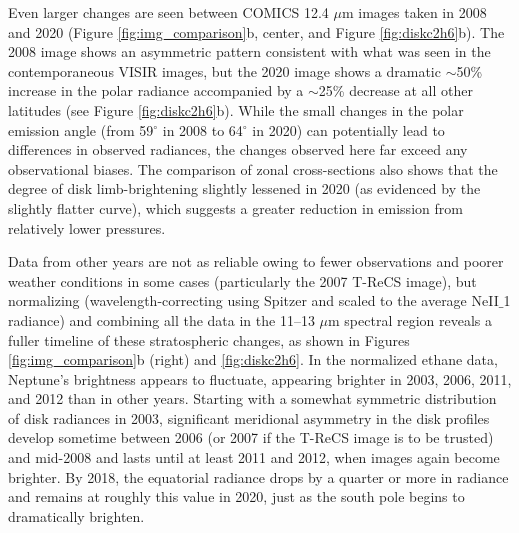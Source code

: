 \documentclass[twocolumn,10pt]{aastex631}
\begin{document}

Even larger changes are seen between COMICS 12.4 $\mu$m images taken in 2008 and 2020 (Figure \ref{fig:img_comparison}b, center, and Figure \ref{fig:diskc2h6}b). The 2008 image shows an asymmetric pattern consistent with what was seen in the contemporaneous VISIR images, but the 2020 image shows a dramatic $\sim$50\% increase in the polar radiance accompanied by a $\sim$25\% decrease at all other latitudes (see Figure \ref{fig:diskc2h6}b). While the small changes in the polar emission angle (from 59$^{\circ}$ in 2008 to 64$^{\circ}$ in 2020) can potentially lead to differences in observed radiances, the changes observed here far exceed any observational biases. The comparison of zonal cross-sections also shows that the degree of disk limb-brightening slightly lessened in 2020 (as evidenced by the slightly flatter curve), which suggests a greater reduction in emission from relatively lower pressures.

Data from other years are not as reliable owing to fewer observations and poorer weather conditions in some cases (particularly the 2007 T-ReCS image), but normalizing (wavelength-correcting using Spitzer and scaled to the average NeII$\_$1 radiance) and combining all the data in the 11--13 $\mu$m spectral region reveals a fuller timeline of these stratospheric changes, as shown in Figures \ref{fig:img_comparison}b (right) and \ref{fig:diskc2h6}. In the normalized ethane data, Neptune's brightness appears to fluctuate, appearing brighter in 2003, 2006, 2011, and 2012 than in other years.  Starting with a somewhat symmetric distribution of disk radiances in 2003, significant meridional asymmetry in the disk profiles develop sometime between 2006 (or 2007 if the T-ReCS image is to be trusted) and mid-2008 and lasts until at least 2011 and 2012, when images again become brighter.  By 2018, the equatorial radiance drops by a quarter or more in radiance and remains at roughly this value in 2020, just as the south pole begins to dramatically brighten.
\end{document}
